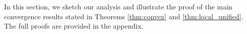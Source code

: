 \documentclass[11pt]{amsart}
\theoremstyle{plain}
\newtheorem{lemma}[theorem]{Lemma}
\theoremstyle{definition}
\theoremstyle{remark}
\def\bE{\mathbf{E}}
\def\I{\mathbf{I}}
\def\param{\boldsymbol{\theta}}
\def\I{\mathbf{I}}
\newcommand{\commHL}[1]{{\textcolor{blue}{#1}}}
\begin{document}
 In this section, we sketch our analysis and illustrate the proof of the main convergence results stated in Theorems \ref{thm:convex} and \ref{thm:local_unified}. The full proofs are provided in the appendix. 
\end{document}
